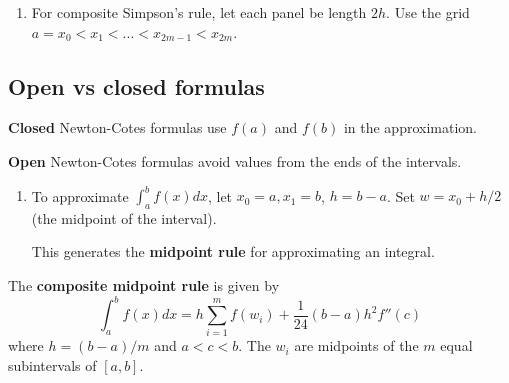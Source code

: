 \documentclass[12pt,letterpaper,noanswers]{exam}
\begin{document}
\begin{enumerate}[resume=classQ]
\item For composite Simpson's rule, let each panel be length $2h$.  Use the grid $a = x_0 < x_1 < ... < x_{2m-1}<x_{2m}$.
\end{enumerate}

\subsection*{Open vs closed formulas}
\begin{tcolorbox}
\textbf{Closed} Newton-Cotes formulas use $f(a)$ and $f(b)$ in the approximation.

\textbf{Open} Newton-Cotes formulas avoid values from the ends of the intervals.
\end{tcolorbox}
\begin{enumerate}[resume=classQ]
    \item To approximate $\displaystyle\int_a^b f(x)dx$, let $x_0 = a, x_1 = b$, $h = b-a$.  Set $w = x_0 + h/2$ (the midpoint of the interval).
This generates the \textbf{midpoint rule} for approximating an integral.
\end{enumerate}
\begin{tcolorbox}
The \textbf{composite midpoint rule} is given by \[\int_a^bf(x)dx = h\sum\limits_{i=1}^m f(w_i) + \frac{1}{24}(b-a)h^2 f''(c)\] where $h = (b-a)/m$ and $a<c<b$.  The $w_i$ are midpoints of the $m$ equal subintervals of $[a,b]$.
\end{tcolorbox}
\end{document}
